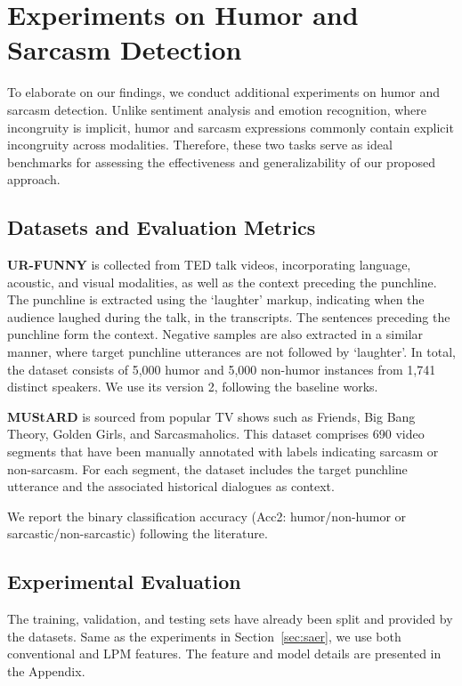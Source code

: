 \documentclass[11pt,a4paper]{article}
\begin{document}
\section{Experiments on Humor and Sarcasm Detection}
To elaborate on our findings, we conduct additional experiments on humor and sarcasm detection. Unlike sentiment analysis and emotion recognition, where incongruity is implicit, humor and sarcasm expressions commonly contain explicit incongruity across modalities. Therefore, these two tasks serve as ideal benchmarks for assessing the effectiveness and generalizability of our proposed approach.

\subsection{Datasets and Evaluation Metrics}
\textbf{UR-FUNNY} \cite{hasan2019ur} is collected from TED talk videos, incorporating language, acoustic, and visual modalities, as well as the context preceding the punchline. The punchline is extracted using the `laughter' markup, indicating when the audience laughed during the talk, in the transcripts. The sentences preceding the punchline form the context. Negative samples are also extracted in a similar manner, where target punchline utterances are not followed by `laughter'. In total, the dataset consists of 5,000 humor and 5,000 non-humor instances from 1,741 distinct speakers. We use its version 2, following the baseline works.

\textbf{MUStARD} \citep{castro2019towards} is sourced from popular TV shows such as Friends, Big Bang Theory, Golden Girls, and Sarcasmaholics. This dataset comprises 690 video segments that have been manually annotated with labels indicating sarcasm or non-sarcasm. For each segment, the dataset includes the target punchline utterance and the associated historical dialogues as context.

We report the binary classification accuracy (Acc2: humor/non-humor or sarcastic/non-sarcastic) following the literature.

\subsection{Experimental Evaluation}
The training, validation, and testing sets have already been split and provided by the datasets. Same as the experiments in Section~\ref{sec:saer}, we use both conventional and LPM features. The feature and model details are presented in the Appendix.
\end{document}
